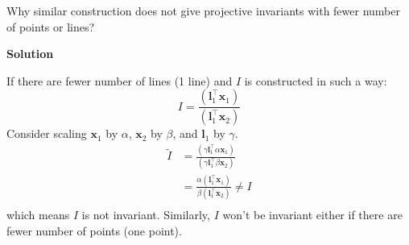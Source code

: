 \documentclass[letterpaper, 11pt]{article}
\begin{document}
Why similar construction does not give projective invariants with fewer number of points
or lines?

\textbf{Solution}

If there are fewer number of lines (1 line) and $I$ is constructed in such a way:
$$
    I = \frac{(\pmb{l}_{1}^\top \pmb{x}_{1})}{(\pmb{l}_{1}^\top \pmb{x}_{2})}
$$
Consider scaling $\pmb{x}_{1}$ by $\alpha$, $\pmb{x}_{2}$ by $\beta$, and $\pmb{l}_{1}$ by $\gamma$.
\begin{align*}
    \widetilde{I} & = \frac{(\gamma\pmb{l}_{1}^\top\alpha \pmb{x}_{1})}{(\gamma\pmb{l}_{1}^\top \beta\pmb{x}_{2})} \\
                  & = \frac{\alpha(\pmb{l}_{1}^\top \pmb{x}_{1})}{\beta(\pmb{l}_{1}^\top \pmb{x}_{2})} \neq I      \\
\end{align*}
which means $I$ is not invariant. Similarly, $I$ won't be invariant either if there are fewer number of points (one point).










\end{document}
